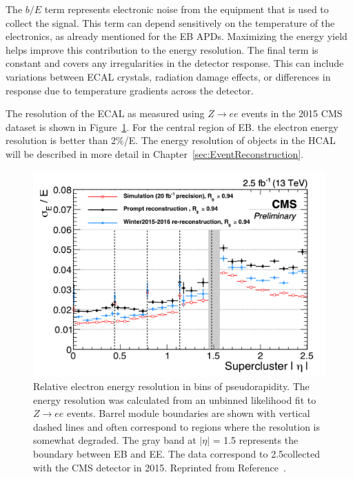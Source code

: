 The $b/E$ term represents electronic noise from the equipment that is used to collect the signal. This term can depend sensitively on the temperature of the electronics, as already mentioned for the EB APDs. Maximizing the energy yield helps improve this contribution to the energy resolution. The final term is constant and covers any irregularities in the detector response. This can include variations between ECAL crystals, radiation damage effects, or differences in response due to temperature gradients across the detector.

The resolution of the ECAL as measured using $Z\rightarrow ee$ events in the 2015 CMS dataset is shown in Figure~\ref{fig:ecal_resolution}. For the central region of EB. the electron energy resolution is better than 2\%/E. The energy resolution of objects in the HCAL will be described in more detail in Chapter~\ref{sec:EventReconstruction}.

\begin{figure}[h!]
	\centering
	\includegraphics[width=\linewidth]{Figures/Detector/EcalEnergyResolution.png}
       \caption{Relative electron energy resolution in bins of pseudorapidity. 
       The energy resolution was calculated from an unbinned likelihood fit to $Z\rightarrow ee$ events.
        Barrel module boundaries are shown with vertical dashed lines and often correspond to regions where the resolution is somewhat degraded. The gray band at $|\eta|$ = 1.5 represents the boundary between EB and EE.
        The data correspond to 2.5\fbinv collected with the CMS detector in 2015.
        Reprinted from Reference~\cite{ECALDPGtwiki2}.}
         \label{fig:ecal_resolution}
\end{figure}

